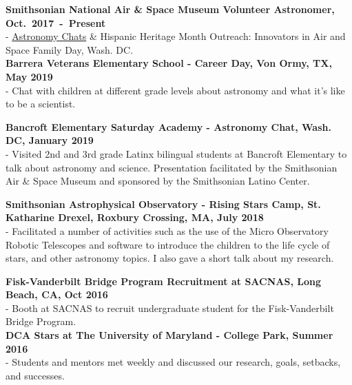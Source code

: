 \documentclass[letter,11pt]{article}
\begin{document}
\noindent
\textbf{Smithsonian National Air \& Space Museum Volunteer Astronomer, Oct.~2017~-~Present}\\
- \href{https://airandspace.si.edu/events/astronomy-chat-gabriella-alvarez-and-laura-vega-0}{Astronomy Chats}
\& Hispanic Heritage Month Outreach: Innovators in Air and Space Family Day, Wash. DC.\\

\noindent
\textbf{Barrera Veterans Elementary School - Career Day, Von Ormy, TX, May 2019 } \\
- Chat with children at different grade levels about astronomy and what it's like to be a scientist.
\vskip 0.2in

\noindent
\textbf{Bancroft Elementary Saturday Academy - Astronomy Chat, Wash. DC, January 2019} \\
- Visited 2nd and 3rd grade Latinx bilingual students at Bancroft Elementary to talk about astronomy and science. Presentation facilitated by the Smithsonian Air \& Space Museum and sponsored by the Smithsonian Latino Center. \\
\vskip 0.01in

\noindent 
\textbf{Smithsonian Astrophysical Observatory - Rising Stars Camp, St. Katharine Drexel, Roxbury Crossing, MA, July 2018} \\
- Facilitated a number of activities such as the use of the Micro Observatory Robotic Telescopes and software to introduce the children to the life cycle of stars, and other astronomy topics. I also gave a short talk about my research.  \\
\vskip 0.01in

\noindent
\textbf{Fisk-Vanderbilt Bridge Program Recruitment at SACNAS, Long Beach, CA, Oct 2016} \\
- Booth at SACNAS to recruit undergraduate student for the Fisk-Vanderbilt Bridge Program. \\

\vskip 0.01in
\noindent
\textbf{DCA Stars at The University of Maryland - College Park, Summer 2016} \\
- Students and mentors met weekly and discussed our research, goals, setbacks, and successes. \\
\end{document}
